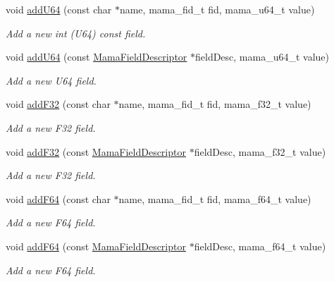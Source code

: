 \begin{DoxyCompactItemize}
void \hyperlink{classWombat_1_1MamaMsg_a3fcd7c973c1771335faddf3302051b15}{addU64} (const char $\ast$name, mama\_\-fid\_\-t fid, mama\_\-u64\_\-t value)
\begin{DoxyCompactList}\small\item\em Add a new int (U64) const field. \item\end{DoxyCompactList}\item 
void \hyperlink{classWombat_1_1MamaMsg_aaf9fe7b41797d219a9e0c0a1767c6dfc}{addU64} (const \hyperlink{classWombat_1_1MamaFieldDescriptor}{MamaFieldDescriptor} $\ast$fieldDesc, mama\_\-u64\_\-t value)
\begin{DoxyCompactList}\small\item\em Add a new U64 field. \item\end{DoxyCompactList}\item 
void \hyperlink{classWombat_1_1MamaMsg_a9975c49769bfa584edb7551fdcccd016}{addF32} (const char $\ast$name, mama\_\-fid\_\-t fid, mama\_\-f32\_\-t value)
\begin{DoxyCompactList}\small\item\em Add a new F32 field. \item\end{DoxyCompactList}\item 
void \hyperlink{classWombat_1_1MamaMsg_a7402072db17e11f62c64e29288c60bfc}{addF32} (const \hyperlink{classWombat_1_1MamaFieldDescriptor}{MamaFieldDescriptor} $\ast$fieldDesc, mama\_\-f32\_\-t value)
\begin{DoxyCompactList}\small\item\em Add a new F32 field. \item\end{DoxyCompactList}\item 
void \hyperlink{classWombat_1_1MamaMsg_a680382f149b56dcc79650560b8150437}{addF64} (const char $\ast$name, mama\_\-fid\_\-t fid, mama\_\-f64\_\-t value)
\begin{DoxyCompactList}\small\item\em Add a new F64 field. \item\end{DoxyCompactList}\item 
void \hyperlink{classWombat_1_1MamaMsg_a8f4fc60f122c70af8a0dccc3c2d6a959}{addF64} (const \hyperlink{classWombat_1_1MamaFieldDescriptor}{MamaFieldDescriptor} $\ast$fieldDesc, mama\_\-f64\_\-t value)
\begin{DoxyCompactList}\small\item\em Add a new F64 field. \item\end{DoxyCompactList}\item 

\end{DoxyCompactItemize}

